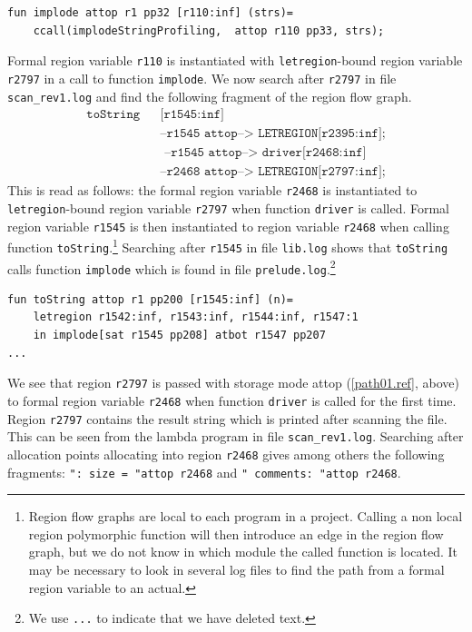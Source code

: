 \documentclass[12pt]{book}
\begin{document}
\begin{verbatim}
fun implode attop r1 pp32 [r110:inf] (strs)= 
    ccall(implodeStringProfiling,  attop r110 pp33, strs); 
\end{verbatim}
\noindent
Formal region variable \texttt{r110} is instantiated with {\tt letregion}-bound
region variable \texttt{r2797} in a call to function \texttt{implode}. We
now search after \texttt{r2797} in file \texttt{scan\_rev1.log} and find the
following fragment of the region flow graph.
\begin{eqnarray}
\texttt{toString}&&\texttt{[r1545:inf]} \nonumber\\
& &\texttt{--r1545 attop-->  LETREGION[r2395:inf];} \nonumber \\
& &\texttt{ --r1545 attop-->   driver[r2468:inf]} \nonumber \\
& &\texttt{--r2468 attop--> LETREGION[r2797:inf];} \label{path01.ref}
\end{eqnarray}
\noindent
This is read as follows: the formal region variable \texttt{r2468} is
instantiated to {\tt letregion}-bound region variable \texttt{r2797} when
function \texttt{driver} is called. Formal region variable \texttt{r1545}
is then instantiated to region variable \texttt{r2468} when calling
function \texttt{toString}.\footnote{Region flow graphs are local to each
  program in a project. Calling a non local region polymorphic function
  will then introduce an edge in the region flow graph, but we do not know
  in which module the called function is located. It may be necessary to
  look in several log files to find the path from a formal region variable
  to an actual.}
Searching after \texttt{r1545} in file \texttt{lib.log} shows that
\texttt{toString} calls function \texttt{implode} which is found in file
\texttt{prelude.log}.\footnote{We use \texttt{...} to indicate that we have
  deleted text.}

\begin{verbatim}
fun toString attop r1 pp200 [r1545:inf] (n)= 
    letregion r1542:inf, r1543:inf, r1544:inf, r1547:1 
    in implode[sat r1545 pp208] atbot r1547 pp207 
...
\end{verbatim}
\noindent
We see that region \texttt{r2797} is passed with storage mode attop
(\ref{path01.ref}, above) to formal region variable \texttt{r2468} when
function \texttt{driver} is called for the first time. Region \texttt{r2797}
contains the result string which is printed after scanning the file. This
can be seen from the lambda program in file \texttt{scan\_rev1.log}.
Searching after allocation points allocating into region \texttt{r2468}
gives among others the following fragments: \texttt{": size = "attop r2468}
and \texttt{" comments: "attop r2468}.
\end{document}
